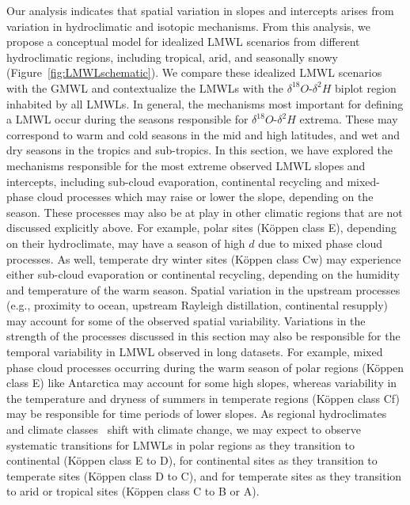 \documentclass[draft, linenumbers]{agujournal2018}
\begin{document}
Our analysis indicates that spatial variation in slopes and intercepts arises from variation in hydroclimatic and isotopic mechanisms. From this analysis, we propose a conceptual model for idealized LMWL scenarios from different hydroclimatic regions, including tropical, arid, and seasonally snowy (Figure~\ref{fig:LMWLschematic}).  We compare these idealized LMWL scenarios with the GMWL and contextualize the LMWLs with the $\delta^{18}O$-$\delta^{2}H$ biplot region inhabited by all LMWLs. In general, the mechanisms most important for defining a LMWL occur during the seasons responsible for $\delta^{18}O$-$\delta^{2}H$ extrema. These may correspond to warm and cold seasons in the mid and high latitudes, and wet and dry seasons in the tropics and sub-tropics. In this section, we have explored the mechanisms responsible for the most extreme observed LMWL slopes and intercepts, including sub-cloud evaporation, continental recycling and mixed-phase cloud processes which may raise or lower the slope, depending on the season. These processes may also be at play in other climatic regions that are not discussed explicitly above. For example, polar sites (K{\"o}ppen class E), depending on their hydroclimate, may have a season of high $d$ due to mixed phase cloud processes. As well, temperate dry winter sites (K{\"o}ppen class Cw) may experience either sub-cloud evaporation or continental recycling, depending on the humidity and temperature of the warm season. Spatial variation in the upstream processes (e.g., proximity to ocean, upstream Rayleigh distillation, continental resupply) may account for some of the observed spatial variability. Variations in the strength of the processes discussed in this section may also be responsible for the temporal variability in LMWL observed in long datasets. For example, mixed phase cloud processes occurring during the warm season of polar regions (K{\"o}ppen class E) like Antarctica may account for some high slopes, whereas variability in the temperature and dryness of summers in temperate regions (K{\"o}ppen class Cf) may be responsible for time periods of lower slopes. As regional hydroclimates and climate classes~\citep{Rubel2010} shift with climate change, we may expect to observe systematic transitions for LMWLs in polar regions as they transition to continental (K{\"o}ppen class E to D), for continental sites as they transition to temperate sites (K{\"o}ppen class D to C), and for temperate sites as they transition to arid or tropical sites (K{\"o}ppen class C to B or A).  
\end{document}
